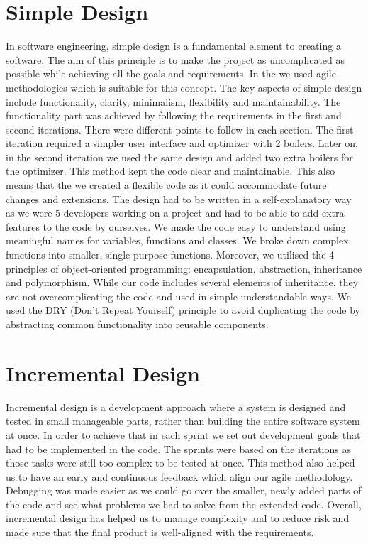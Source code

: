 \documentclass[12pt]{report}
\begin{document}
\section{Simple Design}
In software engineering, simple design is a fundamental element to creating a software. The aim of this principle
is to make the project as uncomplicated as possible while achieving all the goals and requirements. In the we used
agile methodologies which is suitable for this concept. 
The key aspects of simple design include functionality, clarity, minimalism, flexibility and maintainability.
The functionality part was achieved by following the requirements in the first and second iterations. 
There were different points to follow in each section. The first iteration required a simpler user interface 
and optimizer with 2 boilers. Later on, in the second iteration we used the same design and added two extra boilers
for the optimizer. This method kept the code clear and maintainable. This also means that the we created a flexible
code as it could accommodate future changes and extensions.
The design had to be written in a self-explanatory way as we were 5 developers working on a project and had to be able 
to add extra features to the code by ourselves. We made the code easy to understand using meaningful names for variables,
functions and classes. We broke down complex functions into smaller, single purpose functions. Moreover, we utilised the 
4 principles of object-oriented programming: encapsulation, abstraction, inheritance and polymorphism. While our code
includes several elements of inheritance, they are not overcomplicating the code and used in simple understandable ways. 
We used the DRY (Don’t Repeat Yourself) principle to avoid duplicating the code by abstracting common functionality into 
reusable components. 


\section{Incremental Design}
Incremental design is a development approach where a system is designed and tested in small manageable parts, 
rather than building the entire software system at once. In order to achieve that in each sprint we set out 
development goals that had to be implemented in the code. The sprints were based on the iterations as those tasks 
were still too complex to be tested at once. This method also helped us to have an early and continuous feedback 
which align our agile methodology. Debugging was made easier as we could go over the smaller, newly added parts of 
the code and see what problems we had to solve from the extended code. Overall, incremental design has helped us to 
manage complexity and to reduce risk and made sure that the final product is well-aligned with the requirements.
\end{document}
